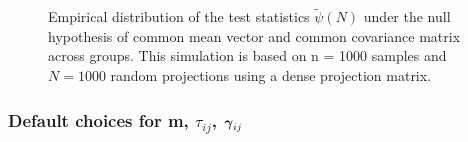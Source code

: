 \documentclass[pdflatex,sn-basic]{sn-jnl}%
\newcommand{\ugamma}            {\mbox{\boldmath$\gamma$}}
\theoremstyle{thmstyleone}%
\theoremstyle{thmstyletwo}%
\theoremstyle{thmstylethree}%
\begin{document}
\begin{figure}[H]
  \centering
{}
\caption{Empirical distribution of the test statistics $\widetilde{\psi}(N)$ under the null hypothesis of common mean vector and common covariance matrix across groups. This simulation is based on n = 1000 samples and $N = 1000$ random projections using a dense projection matrix.}
  \label{fig:BFh0}
\end{figure}
  
\subsubsection{Default choices for m, $\tau_{ij}$, $\ugamma_{ij}$} \label{sec:mtaugam}
\end{document}
